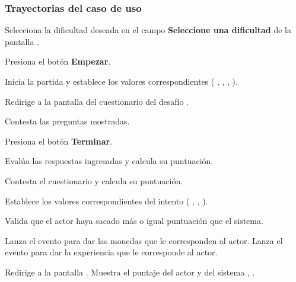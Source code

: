 \begin{UseCase}







\end{UseCase}

\subsubsection{Trayectorias del caso de uso}

\begin{UCtrayectoria}%
%

    \Actor Selecciona la dificultad deseada en el campo {\bf Seleccione una dificultad} de la pantalla .

    \Actor Presiona el botón {\bf Empezar}.

    \Sistema Inicia la partida y establece los valores correspondientes ( , , ,  ).

    \Sistema Redirige a la pantalla del cuestionario del desafío .

    \Actor Contesta las preguntas mostradas.

    \Actor Presiona el botón {\bf Terminar}.

    \Sistema Evalúa las respuestas ingresadas y calcula su puntuación.

    \Sistema Contesta el cuestionario y calcula su puntuación.

    \Sistema Establece los valores correspondientes del intento  (
    ,
    ,
    ).

    \Sistema Valida que el actor haya sacado más o igual puntuación que el sistema. 

    \Sistema Lanza el evento para dar las monedas que le corresponden al actor.
    \Sistema Lanza el evento para dar la experiencia que le corresponde al actor.

    \Sistema Redirige a la pantalla .
    \Sistema Muestra el puntaje del actor y del sistema , .

\end{UCtrayectoria}

